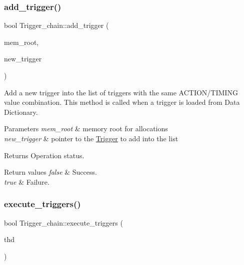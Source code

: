 \subsubsection{\texorpdfstring{add\+\_\+trigger()}{add\_trigger()}\hspace{0.1cm}{\footnotesize\ttfamily [2/2]}}
{\footnotesize\ttfamily bool Trigger\+\_\+chain\+::add\+\_\+trigger (\begin{DoxyParamCaption}\item[{M\+E\+M\+\_\+\+R\+O\+OT $\ast$}]{mem\+\_\+root,  }\item[{\mbox{\hyperlink{classTrigger}{Trigger}} $\ast$}]{new\+\_\+trigger }\end{DoxyParamCaption})}

Add a new trigger into the list of triggers with the same A\+C\+T\+I\+O\+N/\+T\+I\+M\+I\+NG value combination. This method is called when a trigger is loaded from Data Dictionary.


\begin{DoxyParams}{Parameters}
{\em mem\+\_\+root} & memory root for allocations \\
\hline
{\em new\+\_\+trigger} & pointer to the \mbox{\hyperlink{classTrigger}{Trigger}} to add into the list\\
\hline
\end{DoxyParams}
\begin{DoxyReturn}{Returns}
Operation status. 
\end{DoxyReturn}

\begin{DoxyRetVals}{Return values}
{\em false} & Success. \\
\hline
{\em true} & Failure. \\
\hline
\end{DoxyRetVals}
\mbox{\label{classTrigger__chain_aad870e1111c5318613bea0fcc36b1f27}} 
\subsubsection{\texorpdfstring{execute\+\_\+triggers()}{execute\_triggers()}}
{\footnotesize\ttfamily bool Trigger\+\_\+chain\+::execute\+\_\+triggers (\begin{DoxyParamCaption}\item[{T\+HD $\ast$}]{thd }\end{DoxyParamCaption})}

